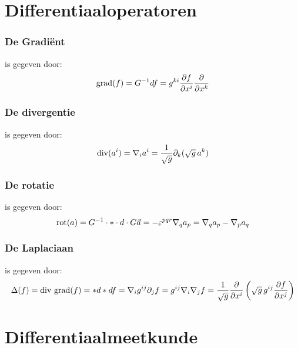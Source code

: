 \section{Differentiaaloperatoren}
\subsubsection{De Gradi\"ent}
is gegeven door:
\[
{\rm grad}(f)=G^{-1}df=g^{ki}\frac{\partial f}{\partial x^i}\frac{\partial }{\partial x^k}
\]

\subsubsection{De divergentie}
is gegeven door:
\[
{\rm div}(a^i)=\nabla_ia^i=\frac{1}{\sqrt{g}}\partial_k(\sqrt{g}\,a^k)
\]

\subsubsection{De rotatie}
is gegeven door:
\[
{\rm rot}(a)=G^{-1}\cdot*\cdot d\cdot G\vec{a}=-\varepsilon^{pqr}\nabla_qa_p=\nabla_qa_p-\nabla_pa_q
\]

\subsubsection{De Laplaciaan}
is gegeven door:
\[
\Delta(f)={\rm div~grad}(f)=*d*df=\nabla_ig^{ij}\partial_jf=g^{ij}\nabla_i\nabla_jf=
\frac{1}{\sqrt{g}}\frac{\partial}{\partial x^i}\left(\sqrt{g}\,g^{ij}\frac{\partial f}{\partial x^j}\right)
\]

\section{Differentiaalmeetkunde}
